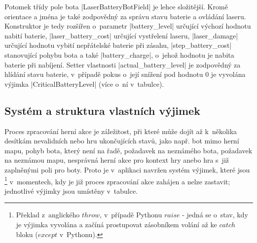 \begin{sloppypar}
    Potomek třídy pole bota \ic|LaserBatteryBotField| je lehce složitější. Kromě orientace a jména je také zodpovědný za správu stavu baterie a ovládání laseru. Konstruktor je tedy rozšířen o~parametr \ic|battery_level| určující výchozí hodnotu nabití baterie, \ic|laser_battery_cost| určující  vystřelení laseru, \ic|laser_damage| určující hodnotu vybití nepřátelské baterie při zásahu, \ic|step_battery_cost| stanovující  pohybu bota a také \ic|battery_charge|, o~jehož hodnotu je nabita baterie při nabíjení. Setter vlastnosti \ic|actual_battery_level| je zodpovědný za hlídání stavu baterie, v~případě pokus o~její snížení pod hodnotu $0$ je vyvolána výjimka \ic|CriticalBatteryLevel| (více o~ní v~tabulce).
\end{sloppypar}

\subsection{Systém a struktura vlastních výjimek}
\label{subsec:custom-exceptions}

Proces zpracování herní akce je záležitost, při které může dojít až k~několika desítkám nevalidních nebo hru ukončujících stavů, jako např. bot mimo herní mapu, pohyb bota, který není na řadě, požadavek na neznámého bota, požadavek na neznámou mapu, nesprávná herní akce pro kontext hry anebo hra s~již zaplněnými poli pro boty. Proto je v~aplikaci navržen systém výjimek, které jsou \footnote{Překlad z~anglického $throw$, v~případě Pythonu $raise$ - jedná se o~stav, kdy je výjimka vyvolána a začíná prostupovat zásobníkem volání až ke $catch$ bloku ($except$ v~Pythonu).} v~momentech, kdy je již proces zpracování akce zahájen a nelze zastavit; jednotlivé výjimky jsou umístěny v~tabulce.

